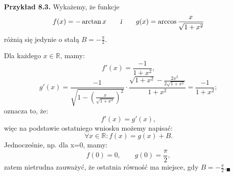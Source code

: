 \documentclass[a4paper,12pt]{article}
\begin{document}
	\textbf{Przykład 8.3.} Wykażemy, że funkcje
	$$
	f(x) = -\arctan x\qquad \textsl{i}  \qquad g(x) = \arccos \frac{x}{\sqrt{1+x^2}}$$
	różnią się jedynie o stałą $B = -\frac{\pi}{2}$.
	
	Dla każdego $x \in \mathbb{R}$, mamy:
	$$
	f'(x) = \frac{-1}{1+x^2},
	$$
	$$
	g'(x) = \frac{-1}{\sqrt{1-\left ( \frac{x}{\sqrt{1+ x^2}}
	\right )^2 }} \cdot
	\frac{\sqrt{1+x^2}-\frac{2x^2}{2\sqrt{1+x^2}}}{1+x^2}
	=
	\frac{-1}{1+x^2};
	$$
	oznacza to, że: 
	$$f'(x) = g'(x),$$
	więc na podstawie ostatniego wniosku możemy napisać:
	$$\forall x \in \mathbb{R}: f(x) = g(x) + B.$$
	Jednocześnie, np. dla x=0, mamy:
	$$f(0) = 0, \qquad g(0)=\frac{\pi}{2},$$
	zatem nietrudna zauważyć, że ostatnia równość ma miejsce, gdy $B = - \frac{\pi}{2}._{\blacksquare}$
\end{document}
